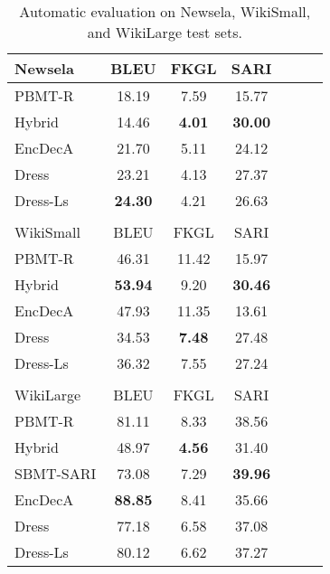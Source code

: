 \documentclass[11pt,letterpaper]{article}
\begin{document}
\begin{table}[t]
	\centering
	\setlength{\belowcaptionskip}{-.5cm}
	\small
	\begin{tabular}{| l | c c c | c c c |}
		\hline
\multicolumn{1}{|l|}{Newsela} & BLEU & FKGL & SARI \\
		\hline
		\hline
		PBMT-R  & 18.19 & 7.59 & 15.77 \\
		Hybrid & 14.46 & {\bf 4.01} & {\bf 30.00} \\
		EncDecA & 21.70 & 5.11 & 24.12 \\
		{\sc Dress}  & 23.21 & 4.13 & {27.37} \\
		{\sc Dress-Ls}  & \bf{24.30} & 4.21 & 26.63 \\
		\hline
		\multicolumn{4}{c}{} \\ \hline
		WikiSmall &  BLEU & FKGL & SARI \\ \hline \hline
		PBMT-R &  46.31 & 11.42 & 15.97 \\
		Hybrid &  \bf{53.94} & \hspace*{.8ex}9.20 & \bf{30.46} \\
		EncDecA &  {47.93} & 11.35 & 13.61 \\
		{\sc Dress} &  34.53 & \hspace*{.8ex}\bf{7.48} & 27.48 \\
		{\sc Dress-Ls} & 36.32 & \hspace*{.8ex}7.55 & 27.24 \\ \hline
		\multicolumn{4}{c}{} \\ \hline
		WikiLarge &  BLEU & FKGL & SARI \\ \hline \hline
		PBMT-R & 81.11 & 8.33 & 38.56 \\
		Hybrid & 48.97 & {\bf 4.56} & 31.40 \\
		SBMT-SARI & 73.08 & 7.29 & {\bf 39.96} \\
		EncDecA & {\bf 88.85} & 8.41 & 35.66 \\
		{\sc Dress} & 77.18  & 6.58 & 37.08 \\
		{\sc Dress-Ls} & 80.12 & 6.62 & 37.27 \\
		\hline
	\end{tabular}
\caption{Automatic evaluation on Newsela, WikiSmall, and WikiLarge
		test sets.}
	\label{tbl:auto-newsela}
\end{table}
\end{document}
